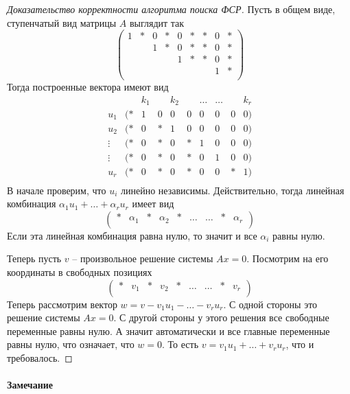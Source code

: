 \begin{proof}
[Доказательство корректности алгоритма поиска ФСР]

Пусть в общем виде, ступенчатый вид матрицы $A$ выглядит так
\[
\begin{pmatrix}
{1}&{*}&{0}&{*}&{0}&{*}&{*}&{0}&{*}\\
{}&{}&{1}&{*}&{0}&{*}&{*}&{0}&{*}\\
{}&{}&{}&{}&{1}&{*}&{*}&{0}&{*}\\
{}&{}&{}&{}&{}&{}&{}&{1}&{*}\\
\end{pmatrix}
\]
Тогда построенные вектора имеют вид
\[
\begin{matrix}
{}&{}&{k_1}&{}&{k_2}&{}&{\ldots}&{\ldots}&{}&{k_r}\\
{u_1 }&{(*}&{1}&{0}&{0}&{0}&{0}&{0}&{0}&{0)}\\
{u_2}&{(*}&{0}&{*}&{1}&{0}&{0}&{0}&{0}&{0)}\\
{\vdots}&{(*}&{0}&{*}&{0}&{*}&{1}&{0}&{0}&{0)}\\
{\vdots}&{(*}&{0}&{*}&{0}&{*}&{0}&{1}&{0}&{0)}\\
{u_r}&{(*}&{0}&{*}&{0}&{*}&{0}&{0}&{*}&{1)}\\
\end{matrix}
\]
В начале проверим, что $u_i$ линейно независимы.
Действительно, тогда линейная комбинация $\alpha_1 u_1 +\ldots + \alpha_r u_r$ имеет вид
\[
\begin{pmatrix}
{*}&{\alpha_1}&{*}&{\alpha_2}&{*}&{\ldots}&{\ldots}&{*}&{\alpha_r}\\
\end{pmatrix}
\]
Если эта линейная комбинация равна нулю, то значит и все $\alpha_i$ равны нулю.

Теперь пусть $v$ -- произвольное решение системы $Ax = 0$.
Посмотрим на его координаты в свободных позициях
\[
\begin{pmatrix}
{*}&{v_1}&{*}&{v_2}&{*}&{\ldots}&{\ldots}&{*}&{v_r}\\
\end{pmatrix}
\]
Теперь рассмотрим вектор $w = v - v_1 u_1 - \ldots - v_r u_r$.
С одной стороны это решение системы $Ax = 0$.
С другой стороны у этого решения все свободные переменные равны нулю.
А значит автоматически и все главные переменные равны нулю, что означает, что $w  = 0$.
То есть $v = v_1 u_1 + \ldots + v_r u_r$, что и требовалось.
\end{proof}

\paragraph{Замечание}

